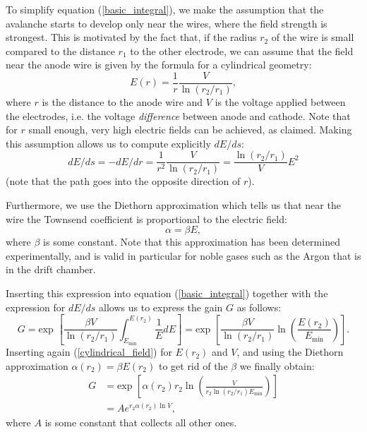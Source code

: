 \documentclass[12pt]{article}
\begin{document}
To simplify equation (\ref{basic_integral}), we make the assumption that the avalanche starts to develop only near the wires, where the field strength is strongest. This is motivated by the fact that, if the radius $r_2$ of the wire is small compared to the distance $r_1$ to the other electrode, we can assume that the field near the anode wire is given by the formula for a cylindrical geometry:	
\begin{equation}
	E(r) = \frac{1}{r}\frac{V}{\ln(r_2/r_1)},
	\label{cylindrical_field}
\end{equation}
where $r$ is the distance to the anode wire and $V$ is the voltage applied between the electrodes, i.e. the voltage \emph{difference} between anode and cathode. Note that for $r$ small enough, very high electric fields can be achieved, as claimed. Making this assumption allows us to compute explicitly $dE/ds$:
\begin{equation}
dE/ds = -dE/dr = \frac{1}{r^2}\frac{V}{\ln(r_2/r_1)} = \frac{\ln(r_2/r_1)}{V}E^2
\end{equation}
(note that the path goes into the opposite direction of $r$).
		
Furthermore, we use the Diethorn approximation which tells us that near the wire the Townsend coefficient is proportional to the electric field:
$$\alpha = \beta E,$$
where $\beta$ is some constant. Note that this approximation has been determined experimentally, and is valid in particular for noble gases such as the Argon that is in the drift chamber.
	
Inserting this expression into equation (\ref{basic_integral}) together with the expression for $dE/ds$ allows us to express the gain $G$ as follows:
\begin{equation}
	G = \text{exp }\left[\frac{\beta V}{\ln(r_2/r_1)} \int^{E(r_2)}_{E_{\min}}\frac{1}{E}dE \right] = \text{exp } \left[\frac{\beta V}{\ln(r_2/r_1)} \ln\left(\frac{E(r_2)}{E_{\min}}\right)\right].
\end{equation}
Inserting again (\ref{cylindrical_field}) for $E(r_2)$ and $V$, and using the Diethorn approximation $\alpha(r_2) = \beta E(r_2)$ to get rid of the $\beta$ we finally obtain:
\begin{equation}
\begin{split}
	G &= \text{exp }\left[\alpha(r_2)r_2\ln\left(\frac{V}{r_2\ln(r_2/r_1)E_{\min}}\right)\right]\\
	& = Ae^{r_2\alpha(r_2)\ln{V}},
\end{split}
\end{equation}
where $A$ is some constant that collects all other ones.
	
\end{document}
